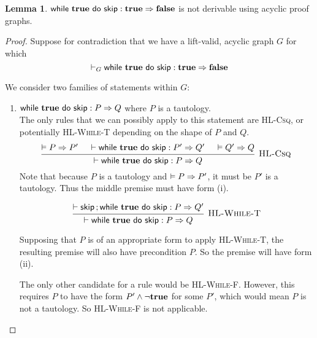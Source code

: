 \documentclass[10pt]{article}
\theoremstyle{definition}
\newtheorem{lemma}{Lemma}
\begin{document}
\begin{lemma}
    $\Triple {\While {\True} do {\Skip} } : \True => \False$ is not derivable using acyclic proof graphs.
\end{lemma}
\begin{proof}
Suppose for contradiction that we have a lift-valid, acyclic graph $G$ for which
$$\DERby G {\Triple {\While {\True} do {\Skip} } : \True => \False}$$

We consider two families of statements within $G$: %
\begin{enumerate}[label=(\roman*)]
\item $\Triple {\While {\True} do {\Skip} } : P => Q$ where $P$ is a tautology. \\
    The only rules that we can possibly apply to this statement are \textsc{HL-Csq},
    or potentially \textsc{HL-While-T} depending on the shape of $P$ and $Q$.
    \[\begin{prooftree}
        \hypo{\VAL P \Rightarrow P'}
        \hypo{\DER \Triple {\While {\True} do {\Skip} } : P' => Q'}
        \hypo{\VAL Q' \Rightarrow Q}
        \infer3[\textsc{HL-Csq}] 
            {\DER \Triple {\While {\True} do {\Skip} } : P => Q}
    \end{prooftree}\]
%
    Note that because $P$ is a tautology and $\vDash P \Rightarrow P'$,
    it must be $P'$ is a tautology.
    Thus the middle premise must have form (i).
    
    \[\begin{prooftree}
        \hypo{\DER \Triple {\Seq {\Skip} ; {\While {\True} do {\Skip}} } : P => Q'}
        \infer1[\textsc{HL-While-T}] 
            {\DER \Triple {\While {\True} do {\Skip} } : P => Q }
    \end{prooftree}\]

    Supposing that $P$ is of an appropriate form to apply \textsc{HL-While-T},
    the resulting premise will also have precondition $P$.
    So the premise will have form (ii).
    
    The only other candidate for a rule would be \textsc{HL-While-F}.
    However, this requires $P$ to have the form $P' \wedge \neg \textbf{true}$ for some $P'$,
    which would mean $P$ is not a tautology. %
    So \textsc{HL-While-F} is not applicable.


\end{enumerate}
\end{proof}
\end{document}
